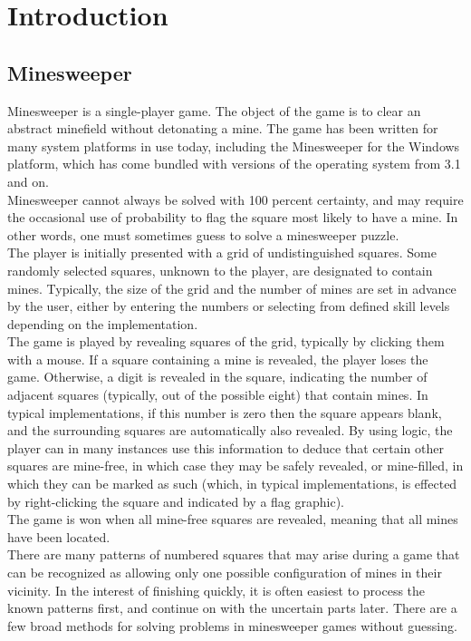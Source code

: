 \documentclass{article}
\begin{document}
\newpage
\section {Introduction}
\subsection{Minesweeper}
Minesweeper is a single-player game. The object of the game is to clear an abstract minefield without detonating a mine. The game has been written for many system platforms in use today, including the Minesweeper for the Windows platform, which has come bundled with versions of the operating system from 3.1 and on.\\
Minesweeper cannot always be solved with 100 percent certainty, and may require the occasional use of probability to flag the square most likely to have a mine. In other words, one must sometimes guess to solve a minesweeper puzzle.\\
The player is initially presented with a grid of undistinguished squares. Some randomly selected squares, unknown to the player, are designated to contain mines. Typically, the size of the grid and the number of mines are set in advance by the user, either by entering the numbers or selecting from defined skill levels depending on the implementation.\\
The game is played by revealing squares of the grid, typically by clicking them with a mouse. If a square containing a mine is revealed, the player loses the game. Otherwise, a digit is revealed in the square, indicating the number of adjacent squares (typically, out of the possible eight) that contain mines. In typical implementations, if this number is zero then the square appears blank, and the surrounding squares are automatically also revealed. By using logic, the player can in many instances use this information to deduce that certain other squares are mine-free, in which case they may be safely revealed, or mine-filled, in which they can be marked as such (which, in typical implementations, is effected by right-clicking the square and indicated by a flag graphic).\\
The game is won when all mine-free squares are revealed, meaning that all mines have been located.\\
There are many patterns of numbered squares that may arise during a game that can be recognized as allowing only one possible configuration of mines in their vicinity. In the interest of finishing quickly, it is often easiest to process the known patterns first, and continue on with the uncertain parts later. There are a few broad methods for solving problems in minesweeper games without guessing.\\
\end{document}
